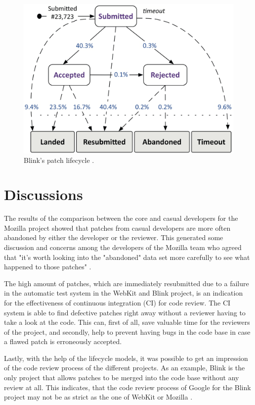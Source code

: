 \documentclass[conference]{IEEEtran}
\begin{document}
\begin{figure}
    \centering
    \includegraphics[scale=0.25]{img/blink.png}
    \caption{Blink's patch lifecycle \cite{baysal2015synthesizing}.}
    \label{fig:blink}
\end{figure}

\section{Discussions}

The results of the comparison between the core and casual developers for the Mozilla project showed that patches from casual developers are more often abandoned by either the developer or the reviewer. This generated some discussion and concerns among the developers of the Mozilla team who agreed that "it's worth looking into the "abandoned" data set more carefully to see what happened to those patches" \cite{baysal2015synthesizing}.

The high amount of patches, which are immediately resubmitted due to a failure in the automatic test system in the WebKit and Blink project, is an indication for the effectiveness of continuous integration (CI) for code review. The CI system is able to find defective patches right away without a reviewer having to take a look at the code. This can, first of all, save valuable time for the reviewers of the project, and secondly, help to prevent having bugs in the code base in case a flawed patch is erroneously accepted.

Lastly, with the help of the lifecycle models, it was possible to get an impression of the code review process of the different projects. As an example, Blink is the only project that allows patches to be merged into the code base without any review at all. This indicates, that the code review process of Google for the Blink project may not be as strict as the one of WebKit or Mozilla \cite{baysal2015synthesizing}.
\end{document}
